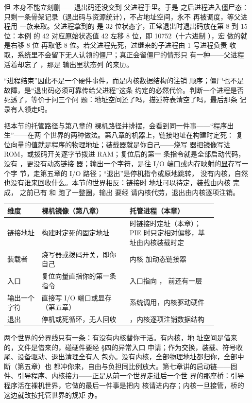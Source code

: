 但  本身不能立刻删——退出码还没交到
父进程手里。于是  之后进程进入僵尸态：
只剩一条骨架记录（退出码与资源统计），不占地址空间，永不
再被调度，等父进程用  一族来取。父进程拿到的
是 32 位状态字，正常退出时退出码放在第 8 到 15 位：本例
的 42 对应原始状态值 42 左移 8 位，即 10752（十六进制
），宏  做的就是右移 8 位
再取低 8 位。若父进程先死，过继来的子进程由 1 号进程负责
收取，系统里不会留下无人认领的僵尸；真正会留僵尸的情形只
有一种——父进程活着却忘了 ，那是 
输出里状态列  的来历。

“进程结束”因此不是一个硬件事件，而是内核数据结构的注销
顺序；僵尸也不是故障，是“退出码必须可靠传给父进程”这条
约定的必然代价。判断一个进程是否死透了，等价于问三个问
题：地址空间还了吗，描述符表清空了吗，最后那条
 记录有人领走吗。

把本节的托管路径与第八章的
裸机路径并排摆，会看到同一件事——“程序出生”——在两
个世界的两种做法。第八章的机器上，链接地址在构建时定死：
复位向量的值就是程序的物理地址；装载器就是你自己——烧写
器把镜像写进 ROM，或拨码开关逐字节拨进 RAM；复位后的第一
条指令就是全部启动代码，没有 ，更没有动态链接
器；输出一个字符，是往 I/O 端口或内存映射的显存写一个字
节，走第五章的 I/O 路径；“退出”是停机指令或原地跳转，
没有内核，自然也没有谁来回收什么。本节的世界相反：链接时
地址可以待定，装载由内核  完成，
之前已有  和  跑了一整圈，输出
要经  请内核代劳，退出由内核逐项注销。

\begin{longtable}{L{0.14\linewidth}L{0.36\linewidth}L{0.36\linewidth}}
\toprule
维度 & 裸机镜像（第八章） & 托管进程（本章） \\
\midrule
链接地址 & 构建时定死的固定地址 &  时链接时定址（本章）；PIE 时只定相对偏移，基址由内核装载时定 \\
装载者 & 烧写器或拨码开关，即你自己 & 内核  加动态链接器 \\
入口 & 复位向量直指你的第一条指令 & 入口指向 ， 前还有一层 \\
输出一个字符 & 直接写 I/O 端口或显存（第五章） &  系统调用，内核驱动硬件 \\
退出 & 停机或死循环，无人回收 & ，内核逐项注销数据结构 \\
\bottomrule
\end{longtable}

两个世界的分界线只有一条：有没有内核替你干活。有内核，地
址空间是借来的，文件是借来的，碰硬件要经 §四的异常入口
申请；作为交换，装载、符号收尾、设备驱动、退出清理全有人
包办。没有内核，全部物理地址都归你，全部中断（第五章）也
都冲你来，自由与负担同比例放大。第七章讲的启动链——固
件、引导程序、内核接力——正是从前一个世界走进后一个世
界的那座桥：引导程序活在裸机世界，它做的最后一件事是把内
核请进内存；内核一旦接管，桥的这边就改按托管世界的规矩
办。

